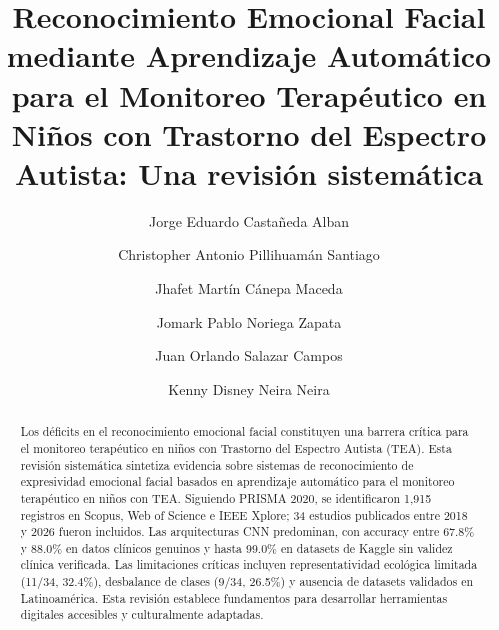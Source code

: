 \documentclass[3p,twocolumn,times]{elsarticle}
\begin{document}
	
	\begin{frontmatter}
		
		\title{Reconocimiento Emocional Facial mediante Aprendizaje Automático para el
			Monitoreo Terapéutico en Niños con Trastorno del Espectro Autista: Una revisión
			sistemática}
		
		\author[1,2]{Jorge Eduardo Castañeda Alban}
		\author[1]{Christopher Antonio Pillihuamán Santiago}
		\author[1]{Jhafet Martín Cánepa Maceda}
		\author[3]{Jomark Pablo Noriega Zapata}
		\author[3]{Juan Orlando Salazar Campos}
		\author[4]{Kenny Disney Neira Neira}
		
		
		
		\begin{abstract}
			Los déficits en el reconocimiento emocional facial constituyen una barrera crítica
			para el monitoreo terapéutico en niños con Trastorno del Espectro Autista (TEA).
			Esta revisión sistemática sintetiza evidencia sobre sistemas de reconocimiento de
			expresividad emocional facial basados en aprendizaje automático para el monitoreo
			terapéutico en niños con TEA. Siguiendo PRISMA 2020, se identificaron 1{,}915
			registros en Scopus, Web of Science e IEEE Xplore; 34 estudios publicados entre 2018
			y 2026 fueron incluidos. Las arquitecturas CNN predominan, con accuracy entre
			67.8\% y 88.0\% en datos clínicos genuinos y hasta 99.0\% en datasets de Kaggle
			sin validez clínica verificada. Las limitaciones críticas incluyen representatividad
			ecológica limitada (11/34, 32.4\%), desbalance de clases (9/34, 26.5\%) y ausencia
			de datasets validados en Latinoamérica. Esta revisión establece fundamentos para
			desarrollar herramientas digitales accesibles y culturalmente adaptadas.
			

\end{abstract}
\end{frontmatter}
\end{document}
